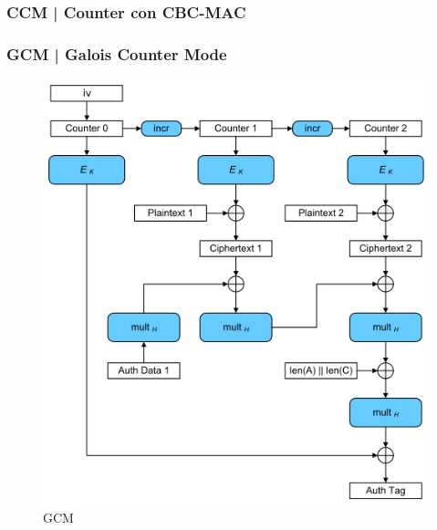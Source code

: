 \textsf{\small }

\subsubsection{CCM | Counter con CBC-MAC}


\textsf{\small }

\subsubsection{GCM | Galois Counter Mode}



\textsf{\small }

\begin{figure}[H]
	\centering
	\includegraphics[width=.9\textwidth, height=.9\textheight, keepaspectratio]{./images/aes_modes/GCM-Galois_Counter_Mode_with_IV} 
	\caption{GCM}
	\label{fig:gcm}
\end{figure}

